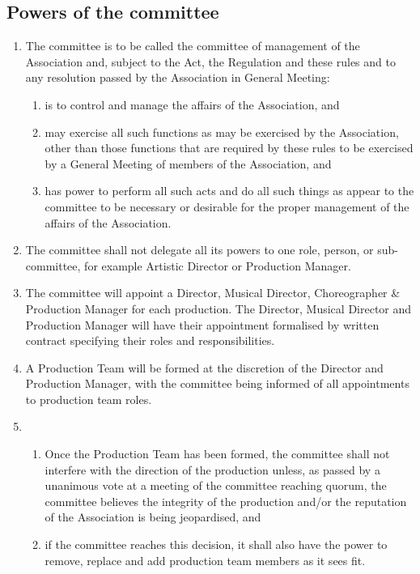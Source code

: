 \documentclass{article}
\begin{document}
\subsection{Powers of the committee}
\begin{enumerate}
  \item The committee is to be called the committee of management of the Association and, subject to the Act, the Regulation and these rules and to any resolution passed by the Association in General Meeting:
    \begin{enumerate}
      \item is to control and manage the affairs of the Association, and
      \item may exercise all such functions as may be exercised by the Association, other than those functions that are required by these rules to be exercised by a General Meeting of members of the Association, and
      \item has power to perform all such acts and do all such things as appear to the committee to be necessary or desirable for the proper management of the affairs of the Association.
    \end{enumerate}
  \item The committee shall not delegate all its powers to one role, person, or sub-committee, for example Artistic Director or Production Manager.
  \item The committee will appoint a Director, Musical Director, Choreographer \& Production Manager for each production. The Director, Musical Director and Production Manager will have their appointment formalised by written contract specifying their roles and responsibilities.
  \item A Production Team will be formed at the discretion of the Director and Production Manager, with the committee being informed of all appointments to production team roles.
  \item
    \begin{enumerate}
      \item Once the Production Team has been formed, the committee shall not interfere with the direction of the production unless, as passed by a unanimous vote at a meeting of the committee reaching quorum, the committee believes the integrity of the production and/or the reputation of the Association is being jeopardised, and
      \item if the committee reaches this decision, it shall also have the power to remove, replace and add production team members as it sees fit.
    \end{enumerate}
\end{enumerate}
\end{document}
